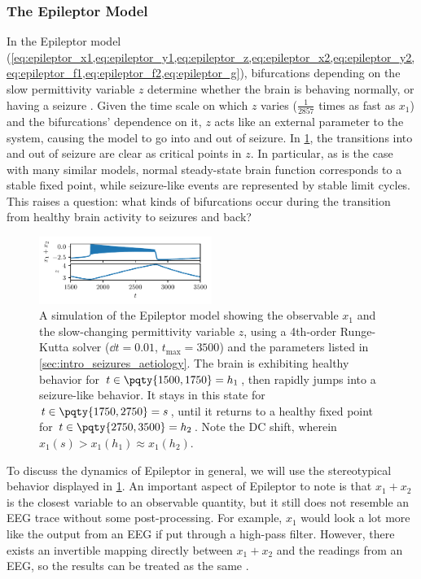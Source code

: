 \subsubsection{The Epileptor Model}
\label{sec:lit_review_bifurcation_epileptor}
In the Epileptor model (\cref{eq:epileptor_x1,eq:epileptor_y1,eq:epileptor_z,eq:epileptor_x2,eq:epileptor_y2,eq:epileptor_f1,eq:epileptor_f2,eq:epileptor_g}), bifurcations depending on the slow permittivity variable $z$ determine whether the brain is behaving normally, or having a seizure \cite{Jirsa2014}.
Given the time scale on which $z$ varies ($\frac{1}{2857}$ times as fast as $x_{1}$) and the bifurcations' dependence on it, $z$ acts like an external parameter to the system, causing the model to go into and out of seizure.
In \cref{fig:epileptor}, the transitions into and out of seizure are clear as critical points in $z$.
In particular, as is the case with many similar models, normal steady-state brain function corresponds to a stable fixed point, while seizure-like events are represented by stable limit cycles.
This raises a question: what kinds of bifurcations occur during the transition from healthy brain activity to seizures and back?
\begin{figure}[ht]
  \centering
  \includegraphics[width=0.5\textwidth]{figure/epileptor.pdf}
  \caption[Epileptor simulation]{A simulation of the Epileptor model showing the observable $x_{1}$ and the slow-changing permittivity variable $z$, using a 4th-order Runge-Kutta solver ($\dd{t} = 0.01$, $t_{\text{max}} = 3500$) and the parameters listed in \cref{sec:intro_seizures_aetiology}.
    The brain is exhibiting healthy behavior for $t \in \pqty{1500, 1750} = h_{1}$, then rapidly jumps into a seizure-like behavior.
    It stays in this state for $t \in \pqty{1750, 2750} = s$, until it returns to a healthy fixed point for $t \in \pqty{2750, 3500} = h_{2}$.
    Note the DC shift, wherein $x_{1}(s) > x_{1}(h_{1}) \approx x_{1}(h_{2})$.
  }
  \label{fig:epileptor}
\end{figure}

To discuss the dynamics of Epileptor in general, we will use the stereotypical behavior displayed in \cref{fig:epileptor}.
An important aspect of Epileptor to note is that $x_{1} + x_{2}$ is the closest variable to an observable quantity, but it still does not resemble an EEG trace without some post-processing.
For example, $x_{1}$ would look a lot more like the output from an EEG if put through a high-pass filter.
However, there exists an invertible mapping directly between $x_{1} + x_{2}$ and the readings from an EEG, so the results can be treated as the same \cite{Jirsa2014}.

